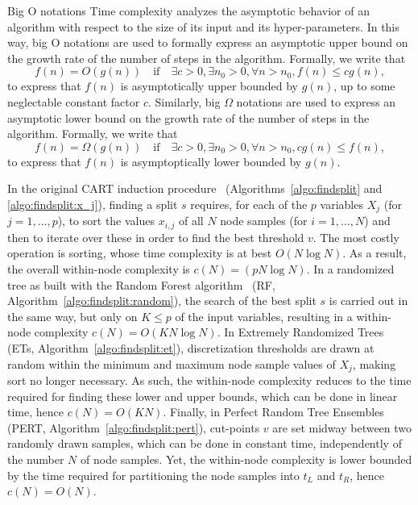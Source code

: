 \begin{remark}{Big O notations}
Time complexity analyzes the asymptotic behavior of an algorithm
with respect to the size of its input and its hyper-parameters. In this way,
big O notations are used to formally express an asymptotic upper bound on the
growth rate of the number of steps in the algorithm. Formally,
we write that
\begin{equation}
f(n) =  O(g(n)) \quad\text{if}\quad \exists c > 0, \exists n_0 > 0, \forall n > n_0, f(n) \leq c g(n),
\end{equation}
to express that  $f(n)$ is asymptotically upper bounded by $g(n)$, up to some neglectable constant factor $c$.
Similarly, big $\Omega$ notations are used to express an asymptotic lower
bound on the growth rate of the number of steps in the algorithm. Formally,
we write that
\begin{equation}
f(n) =  \Omega(g(n)) \quad\text{if}\quad \exists c > 0, \exists n_0 > 0, \forall n > n_0,  c g(n) \leq f(n),
\end{equation}
to express that $f(n)$ is asymptoptically lower bounded by $g(n)$.
\end{remark}

In the original CART induction procedure~\citep{breiman:1984}
(Algorithms~\ref{algo:findsplit} and \ref{algo:findsplit:x_j}), finding a split
$s$  requires, for each of the $p$ variables $X_j$ (for $j=1,\dots,p$), to sort
the values $x_{i,j}$ of all $N$ node samples (for $i=1,\dots,N$) and then to
iterate over these in order to find the best threshold $v$. The most costly
operation is sorting, whose time complexity is at best $O(N \log N)$. As a
result, the overall within-node complexity is $c(N) = (p N \log N)$. In a
randomized tree as built with the Random Forest algorithm~\citep{breiman:2001}
(RF, Algorithm~\ref{algo:findsplit:random}), the search of the best split $s$
is carried out in the same way, but only on $K \leq p$ of the input variables,
resulting in a within-node complexity $c(N) = O(K N \log N)$. In Extremely
Randomized Trees~\citep{geurts:2006} (ETs, Algorithm~\ref{algo:findsplit:et}),
discretization thresholds are drawn at random within the minimum and maximum
node sample values of $X_j$, making sort no longer necessary. As such, the
within-node complexity reduces to the time required for finding these lower and
upper bounds, which can be done in linear time, hence $c(N)=O(KN)$. Finally, in
Perfect Random Tree Ensembles~\citep{cutler:2001} (PERT,
Algorithm~\ref{algo:findsplit:pert}), cut-points $v$ are set midway between
two randomly drawn samples, which can be done in constant time, independently
of the number $N$ of node samples. Yet, the within-node complexity is lower
bounded by the time required for partitioning the node samples into ${t_L}$ and
${t_R}$, hence $c(N)=O(N)$.

